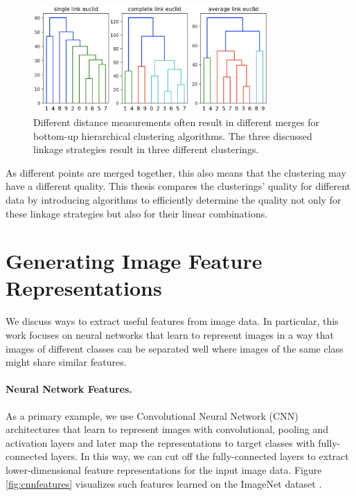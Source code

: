 \begin{figure}[h]
    \centering
    \includegraphics[width=0.8\textwidth]{images/linkage_effects}
    \caption{Different distance measurements often result in different merges for bottom-up hierarchical clustering algorithms. The three discussed linkage strategies result in three different clusterings.}
    \label{fig:linkage_effects}
\end{figure}

As different points are merged together, this also means that the clustering may have a different quality. This thesis compares the clusterings' quality for different data by introducing algorithms to efficiently determine the quality not only for these linkage strategies but also for their linear combinations.

\section{Generating Image Feature Representations}
\label{sec:imagefeatures}

We discuss ways to extract useful features from image data. In particular, this work focuses on neural networks that learn to represent images in a way that images of different classes can be separated well where images of the same class might share similar features. 

\paragraph{Neural Network Features.} As a primary example, we use Convolutional Neural Network (CNN) architectures that learn to represent images with convolutional, pooling and activation layers and later map the representations to target classes with fully-connected layers. In this way, we can cut off the fully-connected layers to extract lower-dimensional feature representations for the input image data. Figure \ref{fig:cnnfeatures} visualizes such features learned on the ImageNet dataset \cite{krizhevsky2012imagenet}.

